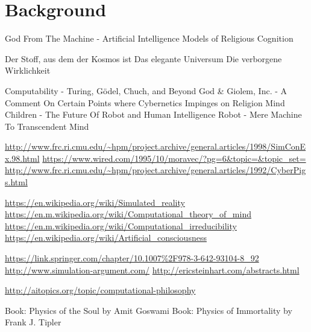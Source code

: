 \section{Background}

God From The Machine - Artificial Intelligence Models of Religious Cognition

Der Stoff, aus dem der Kosmos ist
Das elegante Universum
Die verborgene Wirklichkeit

Computability - Turing, Gödel, Chuch, and Beyond
God \& Giolem, Inc. - A Comment On Certain Points where Cybernetics Impinges on Religion
Mind Children - The Future Of Robot and Human Intelligence
Robot - Mere Machine To Transcendent Mind

\url{http://www.frc.ri.cmu.edu/~hpm/project.archive/general.articles/1998/SimConEx.98.html}
\url{https://www.wired.com/1995/10/moravec/?pg=6&topic=&topic_set=}
\url{http://www.frc.ri.cmu.edu/~hpm/project.archive/general.articles/1992/CyberPigs.html}

\url{https://en.wikipedia.org/wiki/Simulated_reality}
\url{https://en.m.wikipedia.org/wiki/Computational_theory_of_mind}
\url{https://en.m.wikipedia.org/wiki/Computational_irreducibility}
\url{https://en.wikipedia.org/wiki/Artificial_consciousness}

\url{https://link.springer.com/chapter/10.1007%2F978-3-642-93104-8_92}
\url{http://www.simulation-argument.com/}
\url{http://ericsteinhart.com/abstracts.html}

\url{http://aitopics.org/topic/computational-philosophy}

Book: Physics of the Soul by Amit Goswami
Book: Physics of Immortality by Frank J. Tipler